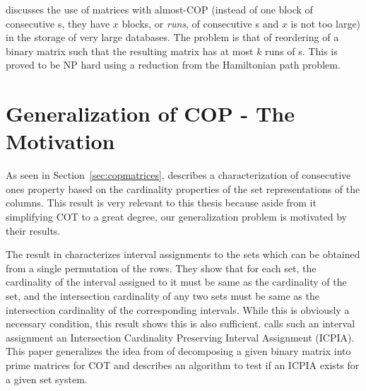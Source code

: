 \documentclass[MS,synopsis]{iitmdiss}
\begin{document}
\cite{jkckv04} discusses the use of matrices with almost-COP (instead
of one block of consecutive {\un}s, they have $x$ blocks, or {\em
  runs}, of consecutive {\un}s and $x$ is not too large) in the
storage of very large databases.  The problem is that of reordering of
a binary matrix such that the resulting matrix has at most $k$ runs of
{\un}s. This is proved to be NP hard using a reduction from the
Hamiltonian path problem.
  

\section{Generalization of COP - The Motivation}  %
\label{sec:motive}
\vspace{\secfirstparatrim}  
As seen in Section~\ref{sec:copmatrices}, \cite{nsnrs09} describes a
characterization of consecutive ones property based on the cardinality
properties of the set representations of the columns. This result is
very relevant to this thesis because aside from it simplifying COT to
a great degree, our generalization problem is motivated by their
results.

The result in
\cite{nsnrs09} characterizes interval assignments to the sets which
can be obtained from a single permutation of the rows.  They show that
for each set, the cardinality of the interval assigned to it must be
same as the cardinality of the set, and the intersection cardinality
of any two sets must be same as the intersection cardinality of the
corresponding intervals.  While this is obviously a necessary
condition, this result shows this is also sufficient.  \cite{nsnrs09}
calls such an interval assignment an Intersection Cardinality
Preserving Interval Assignment (ICPIA).  This paper generalizes the
idea from \cite{wlh02} of decomposing a given binary matrix into prime
matrices for COT and describes an algorithm to test if an ICPIA exists
for a given set system.
\end{document}
